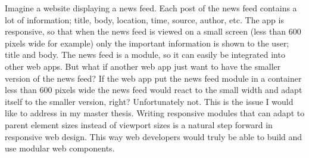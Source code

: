 \documentclass[oneside,a4paper,11pt]{kth-mag}
\begin{document}
Imagine a website displaying a news feed. Each post of the news feed contains a lot of information; title, body, location, time, source, author, etc. The app is responsive, so that when the news feed is viewed on a small screen (less than 600 pixels wide for example) only the important information is shown to the user; title and body. The news feed is a module, so it can easily be integrated into other web apps. But what if another web app just want to have the smaller version of the news feed? If the web app put the news feed module in a container less than 600 pixels wide the news feed would react to the small width and adapt itself to the smaller version, right? Unfortunately not. This is the issue I would like to address in my master thesis. Writing responsive modules that can adapt to parent element sizes instead of viewport sizes is a natural step forward in responsive web design. This way web developers would truly be able to build and use modular web components.
\end{document}
